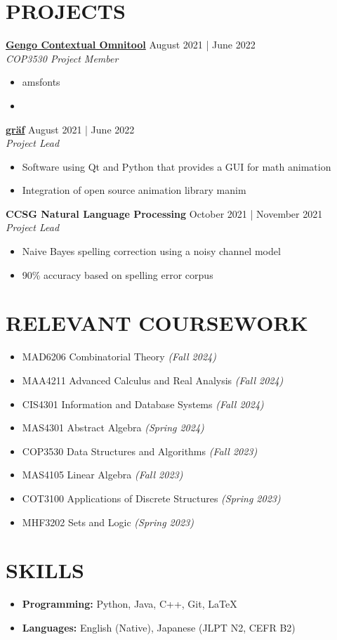 \documentclass[a4paper,9pt]{extarticle}
\begin{document}
\section*{PROJECTS}
\noindent
\textbf{\href{https://github.com/heyuncle/gengo-contextual-omnitool}{Gengo Contextual Omnitool}} \hfill August 2021 | June 2022 \\
\textit{COP3530 Project Member}
\begin{itemize}
     \item amsfonts
     \item 
\end{itemize}
\textbf{\href{https://github.com/heyuncle/graf}{gräf}} \hfill August 2021 | June 2022 \\
\textit{Project Lead}
\begin{itemize}
     \item Software using Qt and Python that provides a GUI for math animation
     \item Integration of open source animation library manim
\end{itemize}
\textbf{CCSG Natural Language Processing} \hfill October 2021 | November 2021 \\
\textit{Project Lead}
\begin{itemize}
     \item Naive Bayes spelling correction using a noisy channel model
     \item 90\% accuracy based on spelling error corpus
\end{itemize}

\section*{RELEVANT COURSEWORK}
\begin{itemize}
     \item MAD6206 Combinatorial Theory \textit{(Fall 2024)}
     \item MAA4211 Advanced Calculus and Real Analysis \textit{(Fall 2024)}
     \item CIS4301 Information and Database Systems \textit{(Fall 2024)}
     \item MAS4301 Abstract Algebra \textit{(Spring 2024)}
     \item COP3530 Data Structures and Algorithms \textit{(Fall 2023)}
     \item MAS4105 Linear Algebra \textit{(Fall 2023)}
     \item COT3100 Applications of Discrete Structures \textit{(Spring 2023)}
     \item MHF3202 Sets and Logic \textit{(Spring 2023)}
 \end{itemize}

\section*{SKILLS}
\begin{itemize}
    \item \textbf{Programming:} Python, Java, C++, Git, \LaTeX
    \item \textbf{Languages:} English (Native), Japanese (JLPT N2, CEFR B2)
\end{itemize}

\end{document}
